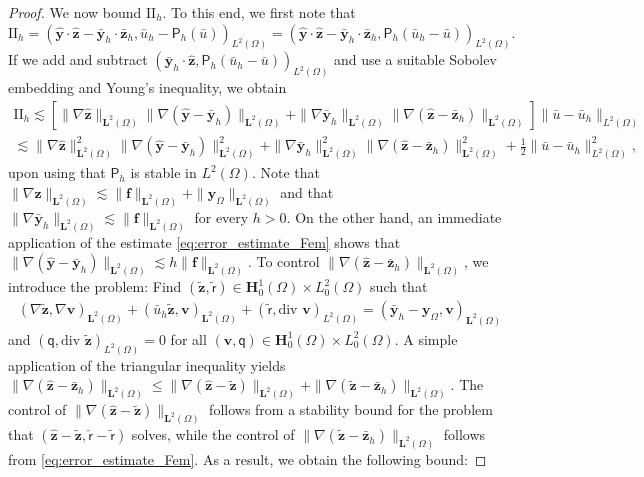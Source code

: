 \documentclass[final]{siamart0216}
\begin{document}
\begin{proof}
We now bound $\text{II}_h$. To this end, we first note that
$
\text{II}_h = (\hat{\mathbf{y}}\cdot\hat{\mathbf{z}}-\bar{\mathbf{y}}_h\cdot\bar{\mathbf{z}}_h,\bar{u}_h-\mathsf{P}_h(\bar{u}))_{L^2(\Omega)}=(\hat{\mathbf{y}}\cdot\hat{\mathbf{z}}-\bar{\mathbf{y}}_h\cdot\bar{\mathbf{z}}_h,\mathsf{P}_h(\bar{u}_h-\bar{u}))_{L^2(\Omega)}.$
If we add and subtract $(\bar{\mathbf{y}}_h\cdot\hat{\mathbf{z}},\mathsf{P}_h(\bar{u}_h-\bar{u}))_{L^2(\Omega)}$ and use a suitable Sobolev embedding and Young's inequality, we obtain
\begin{multline*}
\text{II}_h \lesssim \left[ 
\|\nabla\hat{\mathbf{z}}\|_{\mathbf{L}^{2}(\Omega)}\|\nabla(\hat{\mathbf{y}}-\bar{\mathbf{y}}_h)\|_{\mathbf{L}^{2}(\Omega)} 
+ 
\|\nabla\bar{\mathbf{y}}_h\|_{\mathbf{L}^{2}(\Omega)}\|\nabla(\hat{\mathbf{z}}-\bar{\mathbf{z}}_h)\|_{\mathbf{L}^{2}(\Omega)} \right]
\|\bar{u}-\bar{u}_h\|_{L^2(\Omega)}
\\
\lesssim \|\nabla\hat{\mathbf{z}}\|_{\mathbf{L}^{2}(\Omega)}^2\|\nabla(\hat{\mathbf{y}}-\bar{\mathbf{y}}_h)\|_{\mathbf{L}^2(\Omega)}^2 
+
\|\nabla\bar{\mathbf{y}}_h\|_{\mathbf{L}^{2}(\Omega)}^2 \|\nabla(\hat{\mathbf{z}}-\bar{\mathbf{z}}_h)\|_{\mathbf{L}^2(\Omega)}^2+\tfrac{1}{2}\|\bar{u}-\bar{u}_h\|_{L^2(\Omega)}^2,
\end{multline*}
upon using that $\mathsf{P}_h$ is stable in $L^2(\Omega)$. Note that $\|\nabla\hat{\mathbf{z}}\|_{\mathbf{L}^{2}(\Omega)} \lesssim \| \mathbf{f} \|_{\mathbf{L}^2(\Omega)}+\|\mathbf{y}_{\Omega}\|_{\mathbf{L}^2(\Omega)}$ and that $\|\nabla\bar{\mathbf{y}}_h\|_{\mathbf{L}^{2}(\Omega)} \lesssim \| \mathbf{f} \|_{\mathbf{L}^2(\Omega)}$ for every $h>0$. On the other hand, an immediate application of the estimate \eqref{eq:error_estimate_Fem} shows that $\|\nabla(\hat{\mathbf{y}}-\bar{\mathbf{y}}_h)\|_{\mathbf{L}^2(\Omega)}\lesssim h \|\mathbf{f}\|_{\mathbf{L}^2(\Omega)}$. To control $\|\nabla(\hat{\mathbf{z}}-\bar{\mathbf{z}}_h)\|_{\mathbf{L}^2(\Omega)}$, we introduce the problem: Find $(\tilde{\mathbf{z}},\tilde{\mathsf{r}})\in \mathbf{H}_0^1(\Omega)\times L_0^2(\Omega)$ such that
\begin{align}
\label{eq:aux_problem_adj_3_error}
(\nabla\tilde{\mathbf{z}},\nabla \mathbf{v})_{\mathbf{L}^2(\Omega)}+( \bar{u}_{h}\tilde{\mathbf{z}}, \mathbf{v})_{\mathbf{L}^2(\Omega)}+(\tilde{\mathsf{r}},\text{div }\mathbf{v})_{L^2(\Omega)} = 	(\bar{\mathbf{y}}_h-\mathbf{y}_{\Omega},\mathbf{v})_{\mathbf{L}^2(\Omega)}
\end{align}
and $(\mathsf{q},\text{div }\tilde{\mathbf{z}})_{L^2(\Omega)} =  0$ for all $(\mathbf{v},\mathsf{q}) \in \mathbf{H}_0^1(\Omega) \times L_0^2(\Omega)$. A simple application of the triangular inequality yields $\|\nabla(\hat{\mathbf{z}}-\bar{\mathbf{z}}_h)\|_{\mathbf{L}^2(\Omega)}\leq \|\nabla(\hat{\mathbf{z}}-\tilde{\mathbf{z}})\|_{\mathbf{L}^2(\Omega)}+\|\nabla(\tilde{\mathbf{z}}-\bar{\mathbf{z}}_h)\|_{\mathbf{L}^2(\Omega)}$. The control of $\|\nabla(\hat{\mathbf{z}}-\tilde{\mathbf{z}})\|_{\mathbf{L}^2(\Omega)}$ follows from a stability bound for the problem that $(\hat{\mathbf{z}}-\tilde{\mathbf{z}},\hat{\mathsf{r}}-\tilde{\mathsf{r}})$ solves, while the control of $\|\nabla(\tilde{\mathbf{z}}-\bar{\mathbf{z}}_h)\|_{\mathbf{L}^2(\Omega)}$ follows from \eqref{eq:error_estimate_Fem}. As a result, we obtain the following bound:

\end{proof}
\end{document}
